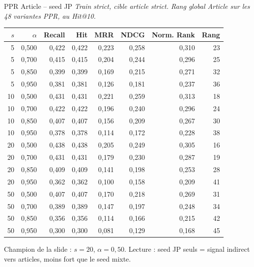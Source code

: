 \documentclass[aspectratio=169,10pt]{beamer}
\newcommand{\keybox}[1]{%
  \begin{center}
  \colorbox{accentsoft}{\parbox{0.92\linewidth}{\centering #1}}
  \end{center}}
\begin{document}
\begin{frame}{PPR Article -- seed JP}
  \tiny
  \textit{Train strict, cible article strict. Rang global Article sur les 48 variantes PPR, au Hit@10.}

  \vspace{0.15em}
  \begin{center}
  \renewcommand{\arraystretch}{0.95}
  \setlength{\tabcolsep}{3pt}
  \begin{tabular}{@{}r r r r r r r r@{}}
    \toprule
    $s$ & $\alpha$ & Recall & Hit & MRR & NDCG & Norm. Rank & Rang \\
    \midrule
    5 & 0,500 & 0,422 & 0,422 & 0,223 & 0,258 & 0,310 & 23 \\
    5 & 0,700 & 0,415 & 0,415 & 0,204 & 0,244 & 0,296 & 25 \\
    5 & 0,850 & 0,399 & 0,399 & 0,169 & 0,215 & 0,271 & 32 \\
    5 & 0,950 & 0,381 & 0,381 & 0,126 & 0,181 & 0,237 & 36 \\
    10 & 0,500 & 0,431 & 0,431 & 0,221 & 0,259 & 0,313 & 18 \\
    10 & 0,700 & 0,422 & 0,422 & 0,196 & 0,240 & 0,296 & 24 \\
    10 & 0,850 & 0,407 & 0,407 & 0,156 & 0,209 & 0,267 & 30 \\
    10 & 0,950 & 0,378 & 0,378 & 0,114 & 0,172 & 0,228 & 38 \\
    \rowcolor{accentsoft}
    20 & 0,500 & 0,438 & 0,438 & 0,205 & 0,249 & 0,305 & 16 \\
    20 & 0,700 & 0,431 & 0,431 & 0,179 & 0,230 & 0,287 & 19 \\
    20 & 0,850 & 0,409 & 0,409 & 0,141 & 0,198 & 0,253 & 28 \\
    20 & 0,950 & 0,362 & 0,362 & 0,100 & 0,158 & 0,209 & 41 \\
    50 & 0,500 & 0,407 & 0,407 & 0,170 & 0,218 & 0,269 & 31 \\
    50 & 0,700 & 0,389 & 0,389 & 0,147 & 0,197 & 0,248 & 34 \\
    50 & 0,850 & 0,356 & 0,356 & 0,114 & 0,166 & 0,215 & 42 \\
    50 & 0,950 & 0,300 & 0,300 & 0,081 & 0,129 & 0,168 & 45 \\
    \bottomrule
  \end{tabular}
  \end{center}

  \vspace{0.2em}
  \keybox{\scriptsize Champion de la slide : $s=20$, $\alpha=0{,}50$.
  Lecture : seed JP seuls = signal indirect vers articles, moins fort que le seed mixte.}
\end{frame}
\end{document}
